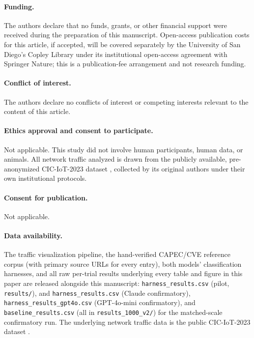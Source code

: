 \documentclass[twocolumn]{svjour3}
\begin{document}
\paragraph{Funding.} The authors declare that no funds, grants, or other financial support were
received during the preparation of this manuscript. Open-access publication costs for this
article, if accepted, will be covered separately by the University of San Diego's Copley Library
under its institutional open-access agreement with Springer Nature; this is a publication-fee
arrangement and not research funding.

\paragraph{Conflict of interest.} The authors declare no conflicts of interest or competing
interests relevant to the content of this article.

\paragraph{Ethics approval and consent to participate.} Not applicable. This study did not
involve human participants, human data, or animals. All network traffic analyzed is drawn from
the publicly available, pre-anonymized CIC-IoT-2023 dataset \cite{cic-iot-2023}, collected by its
original authors under their own institutional protocols.

\paragraph{Consent for publication.} Not applicable.

\paragraph{Data availability.} The traffic visualization pipeline, the hand-verified CAPEC\slash CVE
reference corpus (with primary source URLs for every entry), both models' classification
harnesses, and all raw per-trial results underlying every table and figure in this paper are
released alongside this manuscript: \texttt{harness\allowbreak\_results.csv} (pilot,
\texttt{results/}), and
\texttt{harness\allowbreak\_results.csv} (Claude confirmatory), \texttt{harness\allowbreak\_results\allowbreak\_gpt4o.csv}
(GPT-4o-mini confirmatory), and \texttt{baseline\allowbreak\_results.csv} (all in
\texttt{results\allowbreak\_1000\allowbreak\_v2/}) for the matched-scale confirmatory run. The underlying network
traffic data is the public CIC-IoT-2023 dataset \cite{cic-iot-2023}.
\end{document}
